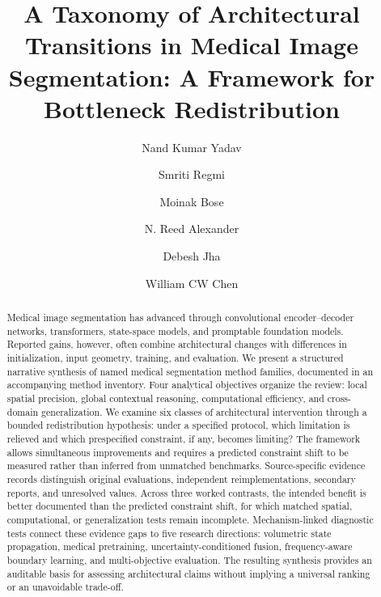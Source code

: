 \documentclass[5p,times,authoryear]{elsarticle}
\begin{document}
\begin{frontmatter}


\title{A Taxonomy of Architectural Transitions in Medical Image Segmentation: A Framework for Bottleneck Redistribution}


\author[Second]{Nand Kumar Yadav}


\author[First]{Smriti Regmi}

\author[First]{Moinak Bose}

\author[Second]{N. Reed Alexander}


\author[First]{Debesh Jha}
\author[Second]{William CW Chen}




\address[First]{Department of Computer Science, University of South Dakota, USA}
\address[Second]{Department of Biomedical and Translational Sciences, Sanford School of Medicine, University of South Dakota, Vermillion, SD, USA}


\begin{abstract}
Medical image segmentation has advanced through convolutional encoder--decoder networks, transformers, state-space models, and promptable foundation models. Reported gains, however, often combine architectural changes with differences in initialization, input geometry, training, and evaluation. We present a structured narrative synthesis of \CorpusTotal{} named medical segmentation method families, documented in an accompanying method inventory. Four analytical objectives organize the review: local spatial precision, global contextual reasoning, computational efficiency, and cross-domain generalization. We examine six classes of architectural intervention through a bounded redistribution hypothesis: under a specified protocol, which limitation is relieved and which prespecified constraint, if any, becomes limiting? The framework allows simultaneous improvements and requires a predicted constraint shift to be measured rather than inferred from unmatched benchmarks. Source-specific evidence records distinguish original evaluations, independent reimplementations, secondary reports, and unresolved values. Across three worked contrasts, the intended benefit is better documented than the predicted constraint shift, for which matched spatial, computational, or generalization tests remain incomplete. Mechanism-linked diagnostic tests connect these evidence gaps to five research directions: volumetric state propagation, medical pretraining, uncertainty-conditioned fusion, frequency-aware boundary learning, and multi-objective evaluation. The resulting synthesis provides an auditable basis for assessing architectural claims without implying a universal ranking or an unavoidable trade-off.
\end{abstract}


\end{frontmatter}
\end{document}
